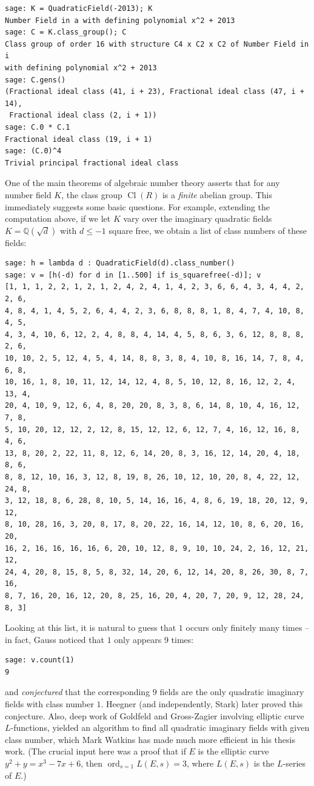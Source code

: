 \documentclass{book}
\DeclareMathOperator{\Cl}{Cl}
\DeclareMathOperator{\ord}{ord}
\newcommand{\Q}{\mathbb{Q}}
\begin{document}
\begin{lstlisting}
sage: K = QuadraticField(-2013); K
Number Field in a with defining polynomial x^2 + 2013
sage: C = K.class_group(); C
Class group of order 16 with structure C4 x C2 x C2 of Number Field in i
with defining polynomial x^2 + 2013
sage: C.gens()
(Fractional ideal class (41, i + 23), Fractional ideal class (47, i + 14),
 Fractional ideal class (2, i + 1))
sage: C.0 * C.1
Fractional ideal class (19, i + 1)
sage: (C.0)^4
Trivial principal fractional ideal class
\end{lstlisting}

One of the main theorems of algebraic number theory asserts that
for any number field $K$, the class group $\Cl(R)$ is a {\em finite}
abelian group.   This immediately suggests some basic questions.
For example, extending the computation above,
if we let $K$ vary over the imaginary quadratic fields
$K=\Q(\sqrt{d})$ with $d\leq -1$ square free, we obtain
a list of class numbers of these fields:
\begin{lstlisting}
sage: h = lambda d : QuadraticField(d).class_number()
sage: v = [h(-d) for d in [1..500] if is_squarefree(-d)]; v
[1, 1, 1, 2, 2, 1, 2, 1, 2, 4, 2, 4, 1, 4, 2, 3, 6, 6, 4, 3, 4, 4, 2, 2, 6,
4, 8, 4, 1, 4, 5, 2, 6, 4, 4, 2, 3, 6, 8, 8, 8, 1, 8, 4, 7, 4, 10, 8, 4, 5,
4, 3, 4, 10, 6, 12, 2, 4, 8, 8, 4, 14, 4, 5, 8, 6, 3, 6, 12, 8, 8, 8, 2, 6,
10, 10, 2, 5, 12, 4, 5, 4, 14, 8, 8, 3, 8, 4, 10, 8, 16, 14, 7, 8, 4, 6, 8,
10, 16, 1, 8, 10, 11, 12, 14, 12, 4, 8, 5, 10, 12, 8, 16, 12, 2, 4, 13, 4,
20, 4, 10, 9, 12, 6, 4, 8, 20, 20, 8, 3, 8, 6, 14, 8, 10, 4, 16, 12, 7, 8,
5, 10, 20, 12, 12, 2, 12, 8, 15, 12, 12, 6, 12, 7, 4, 16, 12, 16, 8, 4, 6,
13, 8, 20, 2, 22, 11, 8, 12, 6, 14, 20, 8, 3, 16, 12, 14, 20, 4, 18, 8, 6,
8, 8, 12, 10, 16, 3, 12, 8, 19, 8, 26, 10, 12, 10, 20, 8, 4, 22, 12, 24, 8,
3, 12, 18, 8, 6, 28, 8, 10, 5, 14, 16, 16, 4, 8, 6, 19, 18, 20, 12, 9, 12,
8, 10, 28, 16, 3, 20, 8, 17, 8, 20, 22, 16, 14, 12, 10, 8, 6, 20, 16, 20,
16, 2, 16, 16, 16, 16, 6, 20, 10, 12, 8, 9, 10, 10, 24, 2, 16, 12, 21, 12,
24, 4, 20, 8, 15, 8, 5, 8, 32, 14, 20, 6, 12, 14, 20, 8, 26, 30, 8, 7, 16,
8, 7, 16, 20, 16, 12, 20, 8, 25, 16, 20, 4, 20, 7, 20, 9, 12, 28, 24, 8, 3]
\end{lstlisting}
Looking at this list, it is natural to guess that $1$ occurs only finitely
many times -- in fact, Gauss noticed that $1$ only appears 9 times:
\begin{lstlisting}
sage: v.count(1)
9
\end{lstlisting}
and {\em conjectured} that the corresponding $9$ fields are the only
quadratic imaginary fields with class number $1$.
Heegner (and independently, Stark) later proved this conjecture.
Also, deep work of Goldfeld and Gross-Zagier involving elliptic
curve $L$-functions, yielded an algorithm to find all quadratic
imaginary fields with given class number, which Mark Watkins has made
much more efficient in his thesis work.  (The crucial input here
was a proof that if $E$ is the elliptic curve $y^2 + y = x^3 - 7x + 6$,
then $\ord_{s=1}L(E,s)=3$, where $L(E,s)$ is the $L$-series
of $E$.)
\end{document}
